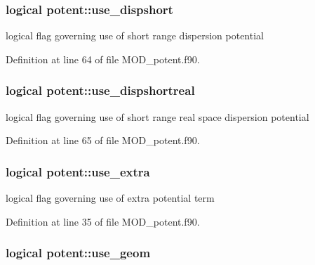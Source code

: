 \hypertarget{classpotent_a3013529f621b1298195625556f78a72d}{
\subsubsection[{use\-\_\-dispshort}]{\setlength{\rightskip}{0pt plus 5cm}logical potent\-::use\-\_\-dispshort}}\label{classpotent_a3013529f621b1298195625556f78a72d}


logical flag governing use of short range dispersion potential 



Definition at line 64 of file M\-O\-D\-\_\-potent.\-f90.

\hypertarget{classpotent_a7583e8a20be4db641d1dcbfdce8d9fbf}{
\subsubsection[{use\-\_\-dispshortreal}]{\setlength{\rightskip}{0pt plus 5cm}logical potent\-::use\-\_\-dispshortreal}}\label{classpotent_a7583e8a20be4db641d1dcbfdce8d9fbf}


logical flag governing use of short range real space dispersion potential 



Definition at line 65 of file M\-O\-D\-\_\-potent.\-f90.

\hypertarget{classpotent_adb62b9a41bba5ee8b80057a1d68a499b}{
\subsubsection[{use\-\_\-extra}]{\setlength{\rightskip}{0pt plus 5cm}logical potent\-::use\-\_\-extra}}\label{classpotent_adb62b9a41bba5ee8b80057a1d68a499b}


logical flag governing use of extra potential term 



Definition at line 35 of file M\-O\-D\-\_\-potent.\-f90.

\hypertarget{classpotent_a61dd7cbf1cf0f3b97223b23fe7711a19}{
\subsubsection[{use\-\_\-geom}]{\setlength{\rightskip}{0pt plus 5cm}logical potent\-::use\-\_\-geom}}\label{classpotent_a61dd7cbf1cf0f3b97223b23fe7711a19}


